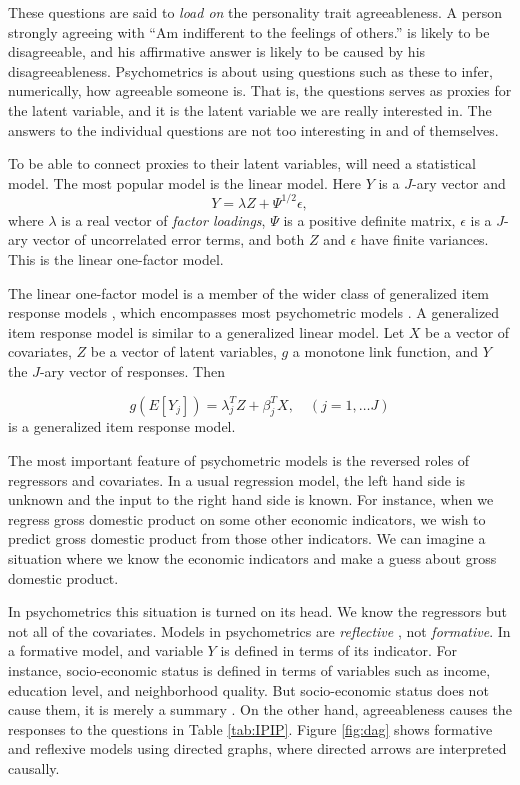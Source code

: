 These questions are said to \textit{load on} the personality trait agreeableness. A person strongly agreeing with ``Am indifferent to the feelings of others.'' is likely to be disagreeable, and his affirmative answer is likely to be caused by his disagreeableness. Psychometrics is about using questions such as these to infer, numerically, how agreeable someone is. That is, the questions serves as proxies for the latent variable, and it is the latent variable we are really interested in. The answers to the individual questions are not too interesting in and of themselves.

To be able to connect proxies to their latent variables, will need a statistical model. The most popular model is the linear model. Here $Y$ is a $J$-ary vector and
\begin{equation}
Y=\lambda Z+\Psi^{1/2}\epsilon,\label{eq:one-factor model}
\end{equation}
where $\lambda$ is a real vector of \emph{factor loadings}, $\Psi$ is a positive definite matrix, $\epsilon$ is a $J$-ary vector of uncorrelated error terms, and both $Z$ and $\epsilon$ have finite variances. This is the linear one-factor model.

The linear one-factor model is a member of the wider class of generalized item response models \parencite{Mellenbergh1994-iy}, which encompasses most psychometric models \parencite[Chapter 3.1]{Borsboom2005-iq}. A generalized item response model is similar to a generalized linear model. Let $X$ be a vector of covariates, $Z$ be a vector of latent variables, $g$ a monotone link function, and $Y$ the $J$-ary vector of responses. Then 

\begin{equation}
g(E[Y_{j}])=\lambda_{j}^{T}Z+\beta_{j}^{T}X,\quad(j=1,\ldots J)\label{eq:GLIRT model}
\end{equation}
is a generalized item response model.

The most important feature of psychometric models is the reversed roles of regressors and covariates. In a usual regression model, the left hand side is unknown and the input to the right hand side is known. For instance, when we regress gross domestic product on some other economic indicators, we wish to predict gross domestic product from those other indicators. We can imagine a situation where we know the economic indicators and make a guess about gross domestic product. 

In psychometrics this situation is turned on its head. We know the regressors but not all of the covariates. Models in psychometrics are \emph{reflective} \parencite[p. 61]{Borsboom2005-iq}, not \emph{formative}. In a formative model, and variable $Y$ is defined in terms of its indicator. For instance, socio-economic status is defined in terms of variables such as income, education level, and neighborhood quality. But socio-economic status does not cause them, it is merely a summary \parencite[p. 62]{Borsboom2005-iq}. On the other hand, agreeableness causes the responses to the questions in Table \ref{tab:IPIP}. Figure \ref{fig:dag} shows formative and reflexive models using directed graphs, where directed arrows are interpreted causally.

